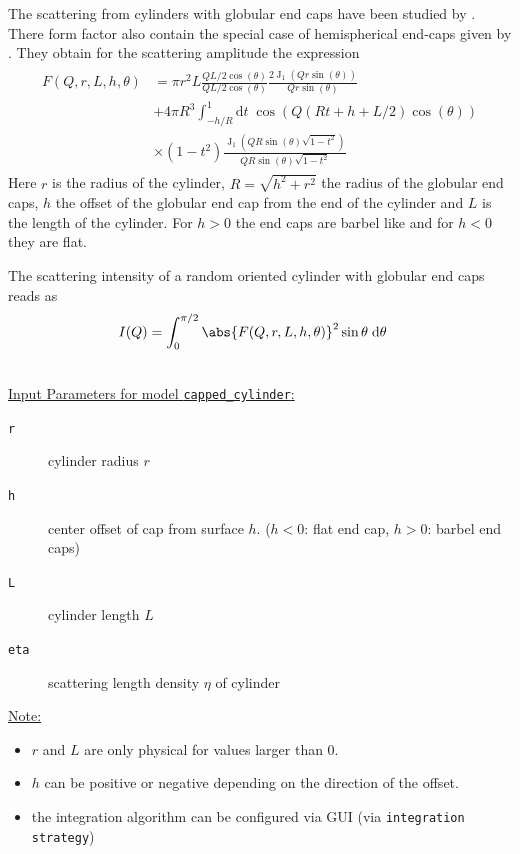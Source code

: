 The scattering from cylinders with globular end caps have been studied by \cite{Kaya:aj5008,Kaya:aj5016}.
There form factor also contain the special case of hemispherical end-caps given by \cite{Cusack1981}. They obtain for the scattering amplitude the expression
\begin{align}\label{eq:CappedCylinders}
\begin{split}
  F(Q,r,L,h,\theta) &= \pi r^2 L \frac{QL/2 \cos(\theta)}{QL/2 \cos(\theta)} \frac{2\operatorname{J}_1(Qr\sin(\theta))}{Qr\sin(\theta)} \\
  & + 4\pi R^3 \int_{-h/R}^1 \mathrm{d}t \; \cos\left(Q(Rt+h+L/2)\cos(\theta)\right)\\
  & \times (1-t^2) \frac{\operatorname{J}_1\left(QR\sin(\theta)\sqrt{1-t^2}\right)}{QR\sin(\theta)\sqrt{1-t^2}}
\end{split}
\end{align}
Here $r$ is the radius of the cylinder, $R=\sqrt{h^2+r^2}$ the radius of the globular end caps, $h$ the offset of the globular end cap from the end of the cylinder and $L$ is the length of the cylinder. For $h>0$ the end caps are barbel like and for $h<0$ they are flat.

The scattering intensity of a random oriented cylinder with globular end caps reads as
\begin{align}\label{eq:randomoriented_cappedcylinders}
  I(Q) &= \int_0^{\pi/2} \abs{F(Q,r,L,h,\theta)}^2 \sin\theta \; \mathrm{d}\theta
\end{align}

\hspace{1pt}\\
\uline{Input Parameters for model \texttt{capped\_cylinder}:}\\
\begin{description}
\item[\texttt{r}] cylinder radius $r$
\item[\texttt{h}] center offset of cap from surface $h$. ($h<0$: flat end cap, $h>0$: barbel end caps)
\item[\texttt{L}] cylinder length $L$
\item[\texttt{eta}] scattering length density $\eta$ of cylinder
\end{description}

\noindent\uline{Note:}
\begin{itemize}
\item $r$ and $L$ are only physical for values larger than 0.
\item $h$ can be positive or negative depending on the direction of the offset.
\item the integration algorithm can be configured via GUI (via \texttt{integration strategy})
\end{itemize}

